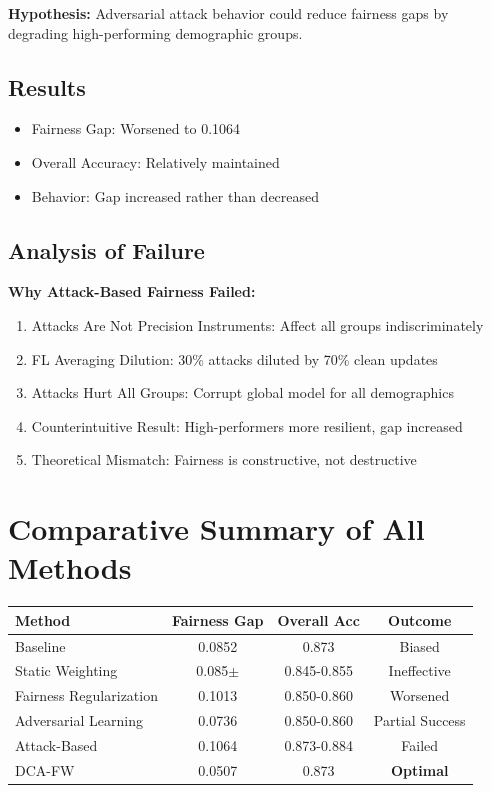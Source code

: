 \documentclass[11pt,a4paper]{report}
\begin{document}
\textbf{Hypothesis:} Adversarial attack behavior could reduce fairness gaps by degrading high-performing demographic groups.

\subsection{Results}

\begin{itemize}
    \item Fairness Gap: Worsened to 0.1064
    \item Overall Accuracy: Relatively maintained
    \item Behavior: Gap increased rather than decreased
\end{itemize}

\subsection{Analysis of Failure}

\textbf{Why Attack-Based Fairness Failed:}
\begin{enumerate}
    \item Attacks Are Not Precision Instruments: Affect all groups indiscriminately
    \item FL Averaging Dilution: 30\% attacks diluted by 70\% clean updates
    \item Attacks Hurt All Groups: Corrupt global model for all demographics
    \item Counterintuitive Result: High-performers more resilient, gap increased
    \item Theoretical Mismatch: Fairness is constructive, not destructive
\end{enumerate}

\section{Comparative Summary of All Methods}

\begin{table}[h]
\centering
\begin{tabular}{lccc}
\toprule
\textbf{Method} & \textbf{Fairness Gap} & \textbf{Overall Acc} & \textbf{Outcome} \\
\midrule
Baseline & 0.0852 & 0.873 & Biased \\
Static Weighting & 0.085$\pm$ & 0.845-0.855 & Ineffective \\
Fairness Regularization & 0.1013 & 0.850-0.860 & Worsened \\
Adversarial Learning & 0.0736 & 0.850-0.860 & Partial Success \\
Attack-Based & 0.1064 & 0.873-0.884 & Failed \\
DCA-FW & 0.0507 & 0.873 & \textbf{Optimal} \\
\bottomrule
\end{tabular}
\end{table}
\end{document}
